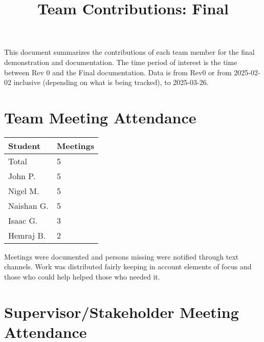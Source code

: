\documentclass{article}
\title{Team Contributions: Final\\\progname}
\author{\authname}
\date{}
\begin{document}
\maketitle

This document summarizes the contributions of each team member for the final
demonstration and documentation.  The time period of interest is the time
between Rev 0 and the Final documentation. Data is from Rev0 or from 2025-02-02 inclusive (depending on what is being tracked), to 2025-03-26.

\newpage
\section{Team Meeting Attendance}


\begin{table}[H]
\centering
\begin{tabular}{ll}
\toprule
\textbf{Student} & \textbf{Meetings}\\
\midrule
Total & 5\\
John P. & 5\\
Nigel M. & 5\\
Naishan G. & 5\\
Isaac G. & 3\\
Hemraj B. & 2\\
\bottomrule
\end{tabular}
\end{table}

Meetings were documented and persons missing were notified through text channels. Work was distributed fairly keeping in account elements of focus and those who could help helped those who needed it.


\newpage
\section{Supervisor/Stakeholder Meeting Attendance}

\end{document}
